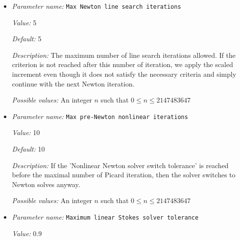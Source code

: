 \begin{itemize}
\item {\it Parameter name:} {\tt Max Newton line search iterations}
\label{parameters:Solver parameters/Newton solver parameters/Max Newton line search iterations}
\label{parameters:Solver_20parameters/Newton_20solver_20parameters/Max_20Newton_20line_20search_20iterations}


{\it Value:} 5


{\it Default:} 5


{\it Description:} The maximum number of line search iterations allowed. If the criterion is not reached after this number of iteration, we apply the scaled increment even though it does not satisfy the necessary criteria and simply continue with the next Newton iteration.


{\it Possible values:} An integer $n$ such that $0\leq n \leq 2147483647$
\item {\it Parameter name:} {\tt Max pre-Newton nonlinear iterations}
\label{parameters:Solver parameters/Newton solver parameters/Max pre_2dNewton nonlinear iterations}
\label{parameters:Solver_20parameters/Newton_20solver_20parameters/Max_20pre_2dNewton_20nonlinear_20iterations}


{\it Value:} 10


{\it Default:} 10


{\it Description:} If the 'Nonlinear Newton solver switch tolerance' is reached before the maximal number of Picard iteration, then the solver switches to Newton solves anyway.


{\it Possible values:} An integer $n$ such that $0\leq n \leq 2147483647$
\item {\it Parameter name:} {\tt Maximum linear Stokes solver tolerance}
\label{parameters:Solver parameters/Newton solver parameters/Maximum linear Stokes solver tolerance}
\label{parameters:Solver_20parameters/Newton_20solver_20parameters/Maximum_20linear_20Stokes_20solver_20tolerance}


{\it Value:} 0.9



\end{itemize}
